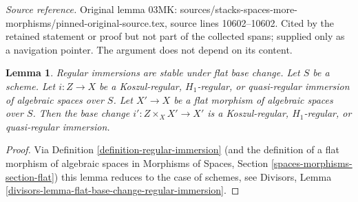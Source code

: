 \documentclass[10pt,a4paper]{amsart}
\theoremstyle{plain}
\newtheorem{lemma}[subsection]{Lemma}
\theoremstyle{definition}
\theoremstyle{remark}
\numberwithin{equation}{subsection}
\newenvironment{slogan}{}{}
\begin{document}
\noindent\textit{Source reference.} Original lemma 03MK: sources/stacks-spaces-more-morphisms/pinned-original-source.tex, source lines 10602--10602. Cited by the retained statement or proof but not part of the collected spans; supplied only as a navigation pointer. The argument does not depend on its content.\par\medskip
\begin{lemma}
\label{lemma-flat-base-change-regular-immersion}
\begin{slogan}
Regular immersions are stable under flat base change.
\end{slogan}
Let $S$ be a scheme. Let $i : Z \to X$ be a Koszul-regular,
$H_1$-regular, or quasi-regular immersion of algebraic spaces over $S$.
Let $X' \to X$ be a flat morphism of algebraic spaces over $S$.
Then the base change $i' : Z \times_X X' \to X'$ is a Koszul-regular,
$H_1$-regular, or quasi-regular immersion.
\end{lemma}

\begin{proof}
Via Definition \ref{definition-regular-immersion}
(and the definition of a flat morphism of algebraic spaces
in Morphisms of Spaces, Section
\ref{spaces-morphisms-section-flat})
this lemma reduces to the case of schemes, see
Divisors, Lemma \ref{divisors-lemma-flat-base-change-regular-immersion}.
\end{proof}
\end{document}
